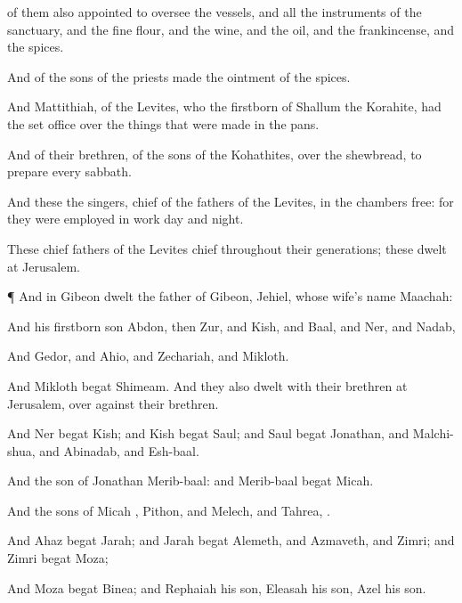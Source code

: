 { of them also
{}
appointed to oversee the
vessels, and all the
instruments of the
sanctuary, and the fine
flour, and the
wine, and the
oil, and the
frankincense, and the
spices.

And
{} of the
sons of the
priests
made the
ointment of the
spices.

And
Mattithiah,
{} of the
Levites, who
{} the
firstborn of
Shallum the
Korahite, had the set
office over the things that were
made in the
pans.

And
{} of their
brethren, of the
sons of the
Kohathites,
{} over the
shewbread, to
prepare
{} every
sabbath.

And these
{} the
singers,
chief of the
fathers of the
Levites,
{} in the
chambers
{}
free: for they were employed in
{}
work
day and
night.

These
chief
fathers of the
Levites
{}
chief throughout their
generations; these
dwelt at
Jerusalem.


\par }{\PP {}¶ And in
Gibeon
dwelt the
father of
Gibeon,
Jehiel, whose
wife’s
name
{}
Maachah:

And his
firstborn
son
Abdon, then
Zur, and
Kish, and
Baal, and
Ner, and
Nadab,

And
Gedor, and
Ahio, and
Zechariah, and
Mikloth.

And
Mikloth
begat
Shimeam. And they also
dwelt with their
brethren at
Jerusalem, over against their
brethren.

And
Ner
begat
Kish; and
Kish
begat
Saul; and
Saul
begat
Jonathan, and
Malchi-shua, and
Abinadab, and
Esh-baal.

And the
son of
Jonathan
{}
Merib-baal: and
Merib-baal
begat
Micah.

And the
sons of
Micah
{},
Pithon, and
Melech, and
Tahrea,
{}.

And
Ahaz
begat
Jarah; and
Jarah
begat
Alemeth, and
Azmaveth, and
Zimri; and
Zimri
begat
Moza;

And
Moza
begat
Binea; and
Rephaiah his
son,
Eleasah his
son,
Azel his
son.

}

